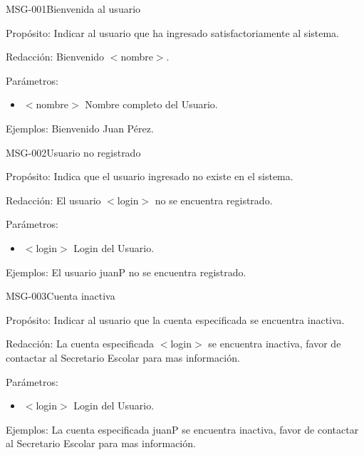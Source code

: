 \begin{cdtMessage}[msgInfoColor]{MSG-001}{Bienvenida al usuario}
	\item[Propósito:] Indicar al usuario que ha ingresado satisfactoriamente al sistema.
	\item[Redacción:] Bienvenido $<$nombre$>$.
	\item[Parámetros:] \hspace{1cm}
	\begin{itemize}
		\item $<$nombre$>$ Nombre completo del Usuario.
	\end{itemize}
	\item[Ejemplos:] Bienvenido Juan Pérez.
\end{cdtMessage}

\begin{cdtMessage}{MSG-002}{Usuario no registrado} 
	\item[Propósito:] Indica que el usuario ingresado no existe en el sistema.
	\item[Redacción:] El usuario $<$login$>$ no se encuentra registrado.
	\item[Parámetros:] \hspace{1cm}
	\begin{itemize}
		\item $<$login$>$ Login del Usuario.
	\end{itemize}
	\item[Ejemplos:] El usuario juanP no se encuentra registrado.
\end{cdtMessage}

\begin{cdtMessage}[msgErrorColor]{MSG-003}{Cuenta inactiva} 
	\item[Propósito:] Indicar al usuario que la cuenta especificada se encuentra inactiva.
	\item[Redacción:] La cuenta especificada $<$login$>$ se encuentra inactiva, favor de contactar al Secretario Escolar para mas información.
	\item[Parámetros:] \hspace{1cm}
	\begin{itemize}
		\item $<$login$>$ Login del Usuario.
	\end{itemize}
	\item[Ejemplos:] La cuenta especificada juanP se encuentra inactiva, favor de contactar al Secretario Escolar para mas información.
\end{cdtMessage}

